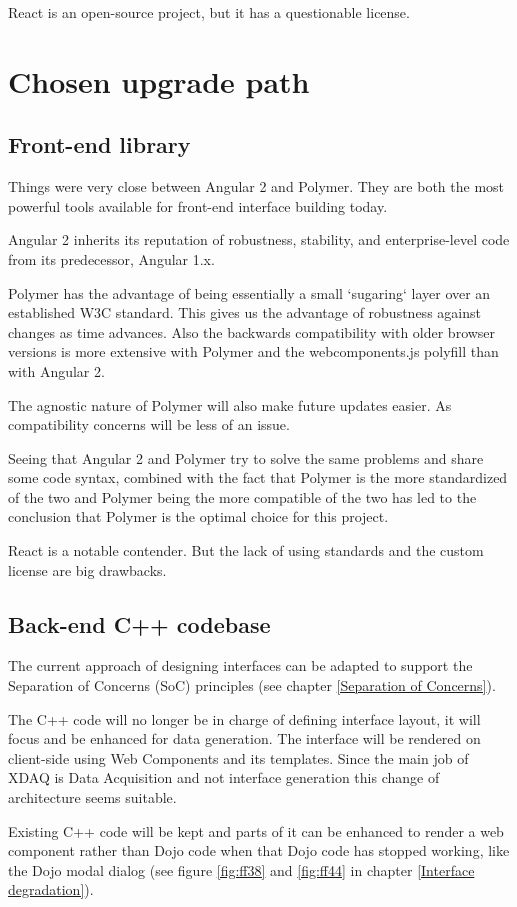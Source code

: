 React is an open-source project, but it has a questionable license.

\section{Chosen upgrade path}
\subsection{Front-end library}
Things were very close between Angular 2 and Polymer.
They are both the most powerful tools available for front-end interface building
today.

Angular 2 inherits its reputation of robustness, stability, and enterprise-level
code from its predecessor, Angular 1.x.

Polymer has the advantage of being essentially a small `sugaring` layer over
an established W3C standard. This gives us the advantage of robustness against
changes as time advances.
Also the backwards compatibility with older browser versions is more extensive
with Polymer and the webcomponents.js polyfill than with Angular 2.

The agnostic nature of Polymer will also make future updates easier. As
compatibility concerns will be less of an issue.

Seeing that Angular 2 and Polymer try to solve the same problems and share some
code syntax, combined with the fact that Polymer is the more standardized of the
two and Polymer being the more compatible of the two has led to the conclusion
that Polymer is the optimal choice for this project.

React is a notable contender. But the lack of using standards and the custom
license are big drawbacks.

\subsection{Back-end C++ codebase}
The current approach of designing interfaces can be adapted to support the
Separation of Concerns (SoC) principles (see chapter \ref{Separation of Concerns}).

The C++ code will no longer be in charge of defining interface layout, it will
focus and be enhanced for data generation.
The interface will be rendered on client-side using Web Components and its
templates.
Since the main job of XDAQ is Data Acquisition and not interface generation this
change of architecture seems suitable.

Existing C++ code will be kept and parts of it can be enhanced to render a web
component rather than Dojo code when that Dojo code has stopped working, like
the Dojo modal dialog (see figure \ref{fig:ff38} and \ref{fig:ff44} in chapter
\ref{Interface degradation}).
